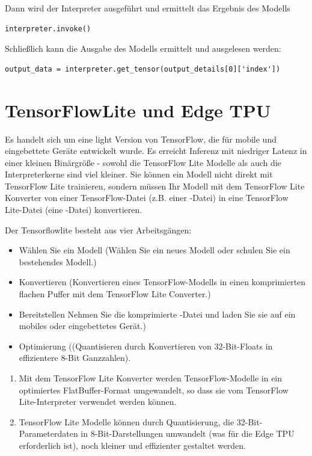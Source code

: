 Dann wird der Interpreter ausgeführt und ermittelt das Ergebnis des Modells
\begin{lstlisting}[frame=none, numbers=none]
interpreter.invoke()
\end{lstlisting}

Schließlich kann die Ausgabe des Modells ermittelt und ausgelesen werden:
\begin{lstlisting}[frame=none, numbers=none]
output_data = interpreter.get_tensor(output_details[0]['index'])
\end{lstlisting}




\chapter{TensorFlowLite und Edge TPU}
Es handelt sich um eine light Version von TensorFlow, die für mobile und eingebettete Geräte entwickelt wurde. 
Es erreicht Inferenz mit niedriger Latenz in einer kleinen Binärgröße - sowohl die TensorFlow Lite Modelle als auch 
die Interpreterkerne sind viel kleiner. Sie können ein Modell nicht direkt mit TensorFlow Lite trainieren, sondern müssen Ihr
 Modell mit dem TensorFlow Lite Konverter von einer TensorFlow-Datei (z.B. einer -Datei) in eine TensorFlow Lite-Datei 
(eine -Datei) konvertieren.\cite{GoogleCoral:2019}

\bigskip

Der Tensorflowlite besteht aus vier Arbeitsgängen:

\begin{itemize}
	\item Wählen Sie ein Modell (Wählen Sie ein neues Modell 
	oder schulen Sie ein bestehendes Modell.)
	\item Konvertieren (Konvertieren eines TensorFlow-Modells 
	in einen komprimierten flachen Puffer mit dem TensorFlow Lite Converter.)
	\item Bereitstellen Nehmen Sie die komprimierte 
	-Datei und laden Sie sie 
	auf ein mobiles oder eingebettetes Gerät.)
	\item Optimierung ((Quantisieren durch Konvertieren von 
	32-Bit-Floats in effizientere 8-Bit 
	Ganzzahlen).\cite{GoogleTensorFlowLite:2021}
\end{itemize}

\bigskip

\begin{enumerate}
	\item Mit dem TensorFlow Lite Konverter werden 
	TensorFlow-Modelle in ein optimiertes FlatBuffer-Format 
	umgewandelt, so dass sie vom TensorFlow Lite-Interpreter 
	verwendet werden können.\cite{GoogleTensorFlowLite:2021}
	\item TensorFlow Lite Modelle können durch Quantisierung, die 
	32-Bit-Parameterdaten in 8-Bit-Darstellungen umwandelt
	(was für die Edge TPU erforderlich ist), noch kleiner 
	und effizienter gestaltet werden.\cite{GoogleCoral:2019}
\end{enumerate}



